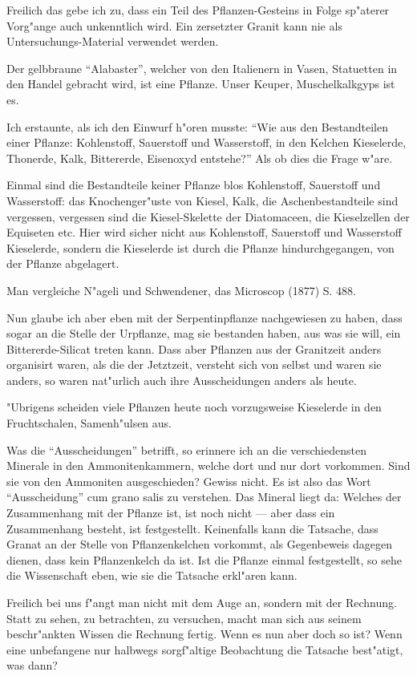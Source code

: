 \documentclass[a4paper, 11pt, oneside, german]{article}
\begin{document}
Freilich das gebe ich zu, dass ein Teil des Pflanzen-Gesteins in Folge sp"aterer Vorg"ange auch unkenntlich wird. Ein zersetzter Granit kann nie als Untersuchungs-Material verwendet werden.

Der gelbbraune "`Alabaster"', welcher von den Italienern in Vasen, Statuetten in den Handel gebracht wird, ist eine Pflanze. Unser Keuper, Muschelkalkgyps ist es.

Ich erstaunte, als ich den Einwurf h"oren musste: "`Wie aus den Bestandteilen einer Pflanze: Kohlenstoff, Sauerstoff und Wasserstoff, in den Kelchen Kieselerde, Thonerde, Kalk, Bittererde, Eisenoxyd entstehe?"' Als ob dies die Frage w"are.

Einmal sind die Bestandteile keiner Pflanze blos Kohlenstoff, Sauerstoff und Wasserstoff: das Knochenger"uste von Kiesel, Kalk, die Aschenbestandteile sind vergessen, vergessen sind die Kiesel-Skelette der Diatomaceen, die Kieselzellen der Equiseten etc. Hier wird sicher nicht aus Kohlenstoff, Sauerstoff und Wasserstoff Kieselerde, sondern die Kieselerde ist durch die Pflanze hindurchgegangen, von der Pflanze abgelagert.

Man vergleiche N"ageli und Schwendener, das Microscop (1877) S. 488.

Nun glaube ich aber eben mit der Serpentinpflanze nachgewiesen zu haben, dass sogar an die Stelle der Urpflanze, mag sie bestanden haben, aus was sie will, ein Bittererde-Silicat treten kann. Dass aber Pflanzen aus der Granitzeit anders organisirt waren, als die der Jetztzeit, versteht sich von selbst und waren sie anders, so waren nat"urlich auch ihre Ausscheidungen anders als heute.

"Ubrigens scheiden viele Pflanzen heute noch vorzugsweise Kieselerde in den Fruchtschalen, Samenh"ulsen aus.

Was die "`Ausscheidungen"' betrifft, so erinnere ich an die verschiedensten Minerale in den Ammonitenkammern, welche dort und nur dort vorkommen. Sind sie von den Ammoniten ausgeschieden? Gewiss nicht. Es ist also das Wort "`Ausscheidung"' cum grano salis zu verstehen. Das Mineral liegt da: Welches der Zusammenhang mit der Pflanze ist, ist noch nicht --- aber dass ein Zusammenhang besteht, ist festgestellt. Keinenfalls kann die Tatsache, dass Granat an der Stelle von Pflanzenkelchen vorkommt, als Gegenbeweis dagegen dienen, dass kein Pflanzenkelch da ist. Ist die Pflanze einmal festgestellt, so sehe die Wissenschaft eben, wie sie die Tatsache erkl"aren kann.

Freilich bei uns f"angt man nicht mit dem Auge an, sondern mit der Rechnung. Statt zu sehen, zu betrachten, zu versuchen, macht man sich aus seinem beschr"ankten Wissen die Rechnung fertig. Wenn es nun aber doch so ist? Wenn eine unbefangene nur halbwegs sorgf"altige Beobachtung die Tatsache best"atigt, was dann?
\end{document}
